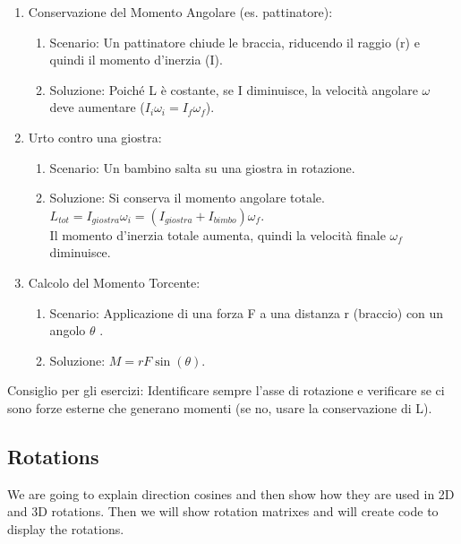 \documentclass[a4paper,10pt]{article}
\begin{document}
\begin{enumerate}
\item Conservazione del Momento Angolare (es. pattinatore):
\begin{enumerate}
        \item Scenario: Un pattinatore chiude le braccia, riducendo il raggio (r) e quindi il momento d'inerzia (I).
        \item Soluzione: Poiché L è costante, se I diminuisce, la velocità angolare \(\omega\) deve aumentare (\(I_i\omega_i = I_f\omega_f\)).
\end{enumerate}
\item Urto contro una giostra:
\begin{enumerate}
        \item Scenario: Un bambino salta su una giostra in rotazione.
         \item Soluzione: Si conserva il momento angolare totale.\\
         \(L_{tot} = I_{giostra}\omega_i = (I_{giostra}+I_{bimbo})\omega_f\).\\
         Il momento d'inerzia totale aumenta, quindi la velocità finale \(\omega_f\) diminuisce.
\end{enumerate}
\item Calcolo del Momento Torcente:
\begin{enumerate}
        \item Scenario: Applicazione di una forza F a una distanza r (braccio) con un angolo \(\theta\) .
        \item Soluzione: \(M = rF\sin(\theta)\).
\end{enumerate}
\end{enumerate}
Consiglio per gli esercizi: Identificare sempre l'asse di rotazione e verificare se ci sono forze esterne che generano momenti (se no, usare la conservazione di L).
\subsection{Rotations}
We are going to explain direction cosines and then show how they are used in 2D and 3D
rotations. Then we will show rotation matrixes and will create code to display the rotations.
\end{document}
